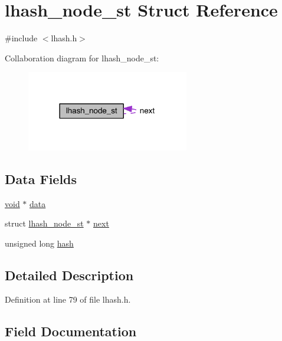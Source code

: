 \hypertarget{structlhash__node__st}{}\section{lhash\+\_\+node\+\_\+st Struct Reference}
\label{structlhash__node__st}


{\ttfamily \#include $<$lhash.\+h$>$}



Collaboration diagram for lhash\+\_\+node\+\_\+st\+:\nopagebreak
\begin{figure}[H]
\begin{center}
\leavevmode
\includegraphics[width=201pt]{structlhash__node__st__coll__graph}
\end{center}
\end{figure}
\subsection*{Data Fields}
\begin{DoxyCompactItemize}
\item 
\hyperlink{hw__4758__cca_8h_afad4d591c7931ff6dc5bf69c76c96aa0}{void} $\ast$ \hyperlink{structlhash__node__st_ac5c5967f62e5c3601479be651a8ed76c}{data}
\item 
struct \hyperlink{structlhash__node__st}{lhash\+\_\+node\+\_\+st} $\ast$ \hyperlink{structlhash__node__st_a7cf05b734aba8aebdd7a04cbd07b1dd6}{next}
\item 
unsigned long \hyperlink{structlhash__node__st_ad10fa3a6614e888a28138088e2623f58}{hash}
\end{DoxyCompactItemize}


\subsection{Detailed Description}


Definition at line 79 of file lhash.\+h.



\subsection{Field Documentation}
